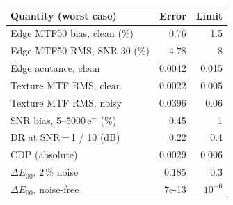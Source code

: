 \begin{tabular}{@{}lrr@{}}
\toprule
Quantity (worst case) & Error & Limit \\
\midrule
Edge MTF50 bias, clean (\%) & 0.76 & 1.5 \\
Edge MTF50 RMS, SNR 30 (\%) & 4.78 & 8 \\
Edge acutance, clean & 0.0042 & 0.015 \\
Texture MTF RMS, clean & 0.0022 & 0.005 \\
Texture MTF RMS, noisy & 0.0396 & 0.06 \\
SNR bias, 5--5000\,e$^-$ (\%) & 0.45 & 1 \\
DR at SNR\,=\,1 / 10 (dB) & 0.22 & 0.4 \\
CDP (absolute) & 0.0029 & 0.006 \\
$\Delta E_{00}$, 2\,\% noise & 0.185 & 0.3 \\
$\Delta E_{00}$, noise-free & 7e-13 & $10^{-6}$ \\
\bottomrule
\end{tabular}
